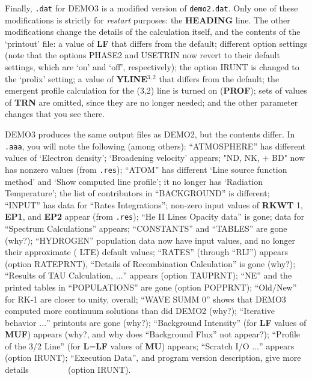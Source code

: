 Finally, {\tt .dat} for DEMO3 is a modified version of {\tt demo2.dat}. Only
one of these modifications is strictly for {\it restart} purposes:
the {\bf HEADING} line. The other modifications
change the details of the calculation itself, and the contents
of the `printout' file:
\bull a value of {\bf LF} that differs from the default;
\bull different option settings (note that the options PHASE2 and USETRIN
now revert to their default settings, which are `on' and `off', 
respectively);
\bull the option IRUNT is changed to the `prolix' setting;
\bull a value of {\bf YLINE}$^{3,2}$ that differs from the default;
\bull the emergent profile calculation for the (3,2) line is turned on
({\bf PROF});
\bull sets of values of {\bf TRN} are omitted, since they are no longer
needed;
\bull and the other parameter changes that you see there. \par

DEMO3 produces the same output files as DEMO2, but the contents differ.
In {\tt .aaa}, you will note the following (among others):
\bull ``ATMOSPHERE'' has different values of `Electron density';
`Broadening velocity' appears;
\bull "ND, NK, + BD" now has nonzero values (from {\tt .res});
\bull ``ATOM'' has different `Line source function method' and `Show computed
line profile'; it no longer has `Radiation Temperature';
\bull the list of contributors in ``BACKGROUND'' is different;
\bull ``INPUT'' has data for ``Rates Integrations''; non-zero input values
of {\bf RKWT} 1, {\bf EP1}, and {\bf EP2} appear (from {\tt .res});
``He II Lines Opacity data'' is gone; data for ``Spectrum Calculations'' appears;
\bull ``CONSTANTS'' and ``TABLES'' are gone (why?);
\bull ``HYDROGEN'' population data now have input values, and no longer
their approximate ({\ie} LTE) default values;
\bull ``RATES'' (through ``RIJ'') appears (option RATEPRNT), ``Details of
Recombination Calculation'' is gone (why?);
\bull ``Results of TAU Calculation, $\ldots$'' appears (option TAUPRNT);
\bull ``NE'' and the printed tables in ``POPULATIONS'' are gone (option POPPRNT);
\bull ``Old/New'' for RK-1 are closer to unity, overall;
\bull ``WAVE SUMM 0'' shows that DEMO3 computed more continuum solutions
than did DEMO2 (why?);
\bull ``Iterative behavior $\ldots$'' printouts are gone (why?);
\bull ``Background Intensity'' (for {\bf LF} values of {\bf MUF}) appears
(why?, and why does ``Background Flux'' not appear?);
\bull ``Profile of the 3/2 Line'' (for {\bf L}={\bf LF} values of 
{\bf MU}) appears;
\bull ``Scratch I/O $\ldots$'' appears (option IRUNT);
\bull ``Execution Data'', and program version description, give more
details $\qquad \qquad$ \break (option IRUNT).

